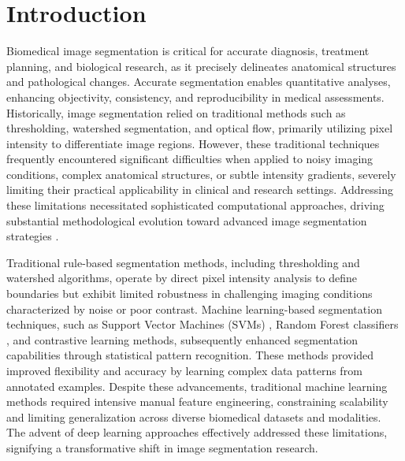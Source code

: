 \documentclass[./dissertation.tex]{subfiles}
\begin{document}
\chapter{Introduction}



Biomedical image segmentation is critical for accurate diagnosis, treatment planning, and biological research, as it precisely delineates anatomical structures and pathological changes. Accurate segmentation enables quantitative analyses, enhancing objectivity, consistency, and reproducibility in medical assessments. Historically, image segmentation relied on traditional methods such as thresholding, watershed segmentation, and optical flow, primarily utilizing pixel intensity to differentiate image regions. However, these traditional techniques frequently encountered significant difficulties when applied to noisy imaging conditions, complex anatomical structures, or subtle intensity gradients, severely limiting their practical applicability in clinical and research settings. Addressing these limitations necessitated sophisticated computational approaches, driving substantial methodological evolution toward advanced image segmentation strategies \cite{isensee2021nnu, hatamizadeh2022unetr}.


Traditional rule-based segmentation methods, including thresholding and watershed algorithms, operate by direct pixel intensity analysis to define boundaries but exhibit limited robustness in challenging imaging conditions characterized by noise or poor contrast. Machine learning-based segmentation techniques, such as Support Vector Machines (SVMs) \cite{cortes1995support}, Random Forest classifiers \cite{breiman2001random}, and contrastive learning methods, subsequently enhanced segmentation capabilities through statistical pattern recognition. These methods provided improved flexibility and accuracy by learning complex data patterns from annotated examples. Despite these advancements, traditional machine learning methods required intensive manual feature engineering, constraining scalability and limiting generalization across diverse biomedical datasets and modalities. The advent of deep learning approaches effectively addressed these limitations, signifying a transformative shift in image segmentation research.
\end{document}

